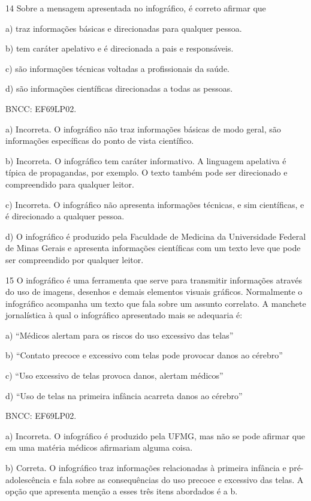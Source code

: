
\num{14} Sobre a mensagem apresentada no infográfico, é correto afirmar
que

a) traz informações básicas e direcionadas para qualquer pessoa.

b) tem caráter apelativo e é direcionada a pais e responsáveis.

c) são informações técnicas voltadas a profissionais da saúde.

d) são informações científicas direcionadas a todas as pessoas.

BNCC: EF69LP02.

a) Incorreta. O infográfico não traz informações básicas de modo geral,
são informações específicas do ponto de vista científico.

b) Incorreta. O infográfico tem caráter informativo. A linguagem
apelativa é típica de propagandas, por exemplo. O texto também pode ser
direcionado e compreendido para qualquer leitor.

c) Incorreta. O infográfico não apresenta informações técnicas, e sim
científicas, e é direcionado a qualquer pessoa.

d) O infográfico é produzido pela Faculdade de Medicina da Universidade
Federal de Minas Gerais e apresenta informações científicas com um texto
leve que pode ser compreendido por qualquer leitor.

\num{15} O infográfico é uma ferramenta que serve para transmitir
informações através do uso de imagens, desenhos e demais elementos
visuais gráficos. Normalmente o infográfico acompanha um texto que fala
sobre um assunto correlato. A manchete jornalística à qual o infográfico
apresentado mais se adequaria é:

a) ``Médicos alertam para os riscos do uso excessivo das telas''

b) ``Contato precoce e excessivo com telas pode provocar danos ao
cérebro﻿''

c) ``Uso excessivo de telas provoca danos, alertam médicos''

d) ``Uso de telas na primeira infância acarreta danos ao cérebro''

BNCC: EF69LP02.

a) Incorreta. O infográfico é produzido pela UFMG, mas não se pode
afirmar que em uma matéria médicos afirmariam alguma coisa.

b) Correta. O infográfico traz informações relacionadas à primeira
infância e pré-adolescência e fala sobre as consequências do uso precoce
e excessivo das telas. A opção que apresenta menção a esses três itens
abordados é a b.

